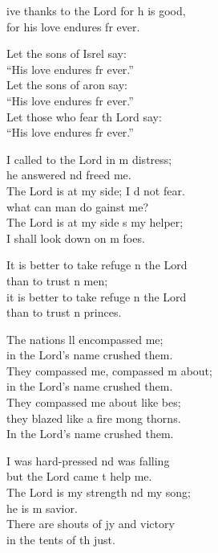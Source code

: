 \settowidth{\versewidth}{I shall not die, I shall live and recount his deeds.}
\begin{psalmverse}%
  \begin{patverse}
    ive thanks to the Lord for h is good,\Med\\
    for his love endures fr ever.

    Let the sons of Isrel say:\Med\\
    “His love endures fr ever.”\\
    Let the sons of aron say:\Med\\
    “His love endures fr ever.”\\
    Let those who fear th Lord say:\Med\\
    “His love endures fr ever.”

    I called to the Lord in m distress;\Med\\
    he answered nd freed me.\\
    The Lord is at my side; I d not fear.\Med\\
    what can man do gainst me?\\
    The Lord is at my side s my helper;\Med\\
    I shall look down on m foes.

    It is better to take refuge \pointup{\i}n the Lord\Med\\
    than to trust \pointup{\i}n men;\\
    it is better to take refuge \pointup{\i}n the Lord\Med\\
    than to trust \pointup{\i}n princes.

    The nations ll encompassed me;\Med\\
    in the Lord’s name  crushed them.\\
    They compassed me, compassed m about;\Med\\
    in the Lord’s name  crushed them.\\
    They compassed me about like bes;\Flex\\
    they blazed like a fire mong thorns.\Med\\
    In the Lord’s name  crushed them.

    I was hard-pressed nd was falling\Med\\
    but the Lord came t help me.\\
    The Lord is my strength nd my song;\Med\\
    he is m savior.\\
    There are shouts of jy and victory\Med\\
    in the tents of th just.


\end{patverse}
\end{psalmverse}
